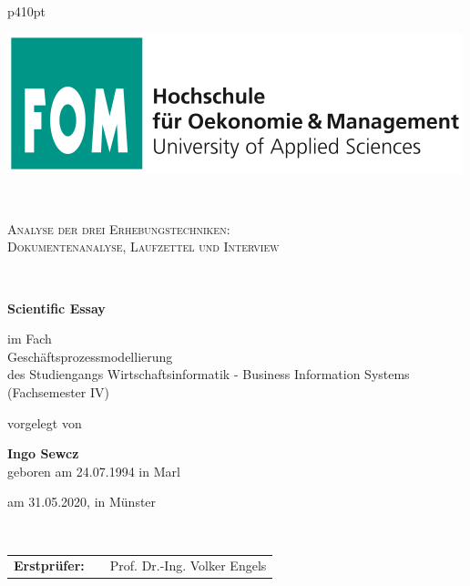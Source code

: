 \begin{center}
\begin{tabular}{p{410pt}}%


\begin{center}
\includegraphics[scale=0.4]{img/fomlogo.png}
\end{center}


\\

\begin{center}
\LARGE{\textsc{
Analyse der drei Erhebungstechniken:\\Dokumentenanalyse, Laufzettel und Interview\\
}}
\end{center}

\\

\begin{center}
\textbf{\Large{Scientific Essay}}
\end{center}


\begin{center}
im Fach\\
Geschäftsprozessmodellierung \\
des Studiengangs Wirtschaftsinformatik - Business Information Systems \\
(Fachsemester IV)
\end{center}


\begin{center}
vorgelegt von
\end{center}

\begin{center}
\large{\textbf{Ingo Sewcz}} \\
\small{geboren am 24.07.1994 in Marl}
\end{center}

\begin{center}
\large{am 31.05.2020, in Münster}
\end{center}

\\

\begin{center}
\begin{tabular}{lll}
\textbf{Erstprüfer:} & & Prof. Dr.-Ing. Volker Engels\\
\end{tabular}
\end{center}

\end{tabular}
\end{center}
